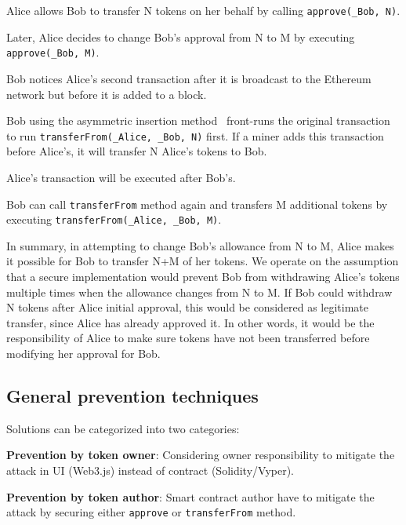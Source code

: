 \begin{compactlistn}
	\item Alice allows Bob to transfer N tokens on her behalf by calling \texttt{approve(\_Bob, N)}.
	\item Later, Alice decides to change Bob's approval from N to M by executing \texttt{approve(\_Bob, M)}.
	\item Bob notices Alice's second transaction after it is broadcast to the Ethereum network but before it is added to a block. 
	\item Bob using the asymmetric insertion method~\cite{eskandari2019sok} front-runs the original transaction to run  \texttt{transferFrom(\_Alice, \_Bob, N)} first. If a miner adds this transaction before Alice's, it will transfer N Alice's tokens to Bob.
	\item Alice's transaction will be executed after Bob's.
	\item Bob can call \texttt{transferFrom} method again and transfers M additional tokens by executing \texttt{transferFrom(\_Alice, \_Bob, M)}.
\end{compactlistn}

In summary, in attempting to change Bob's allowance from N to M, Alice makes it possible for Bob to transfer N+M of her tokens. We operate on the assumption that a secure implementation would prevent Bob from withdrawing Alice's tokens multiple times when the allowance changes from N to M. If Bob could withdraw N tokens after Alice initial approval, this would be considered as legitimate transfer, since Alice has already approved it. In other words, it would be the responsibility of Alice to make sure tokens have not been transferred before modifying her approval for Bob.

\subsection{General prevention techniques}

Solutions can be categorized into two categories:
\begin{compactlist}
	\item \textbf{Prevention by token owner}: Considering owner responsibility to mitigate the attack in UI (\eg Web3.js) instead of contract (\ie Solidity/Vyper).
	\item \textbf{Prevention by token author}: Smart contract author have to mitigate the attack by securing either \texttt{approve} or \texttt{transferFrom} method.
\end{compactlist}

